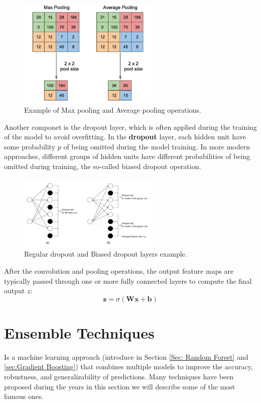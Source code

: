 \begin{figure}[H] 
    \centering
    \includegraphics[width=0.6\textwidth]{Machine_learning_thesis/Images/Max pooling and Average pooling.png}
    \caption{Example of Max pooling and Average pooling operations.} 
    \label{fig:Max pooling and Average pooling} 
\end{figure}
Another componet is the dropout layer, which is often applied during the training of the model to avoid overfitting. In the \textbf{dropout} layer, each hidden unit have some probability $p$ of being omitted
during the model training. In more modern approaches, different groups of hidden units have different probabilities of being omitted during training, the so-called biased dropout operation.
\begin{figure}[H] 
    \centering
    \includegraphics[width=0.6\textwidth]{Machine_learning_thesis/Images/Dropout.png}
    \caption{Regular dropout and Biased dropout layers example.} 
    \label{fig:Regular dropout and Biased dropout} 
\end{figure}
After the convolution and pooling operations, the output feature maps are typically passed through one or more fully connected layers to compute the final output $z$:
\[
\mathbf{z} = \sigma(\mathbf{W} \mathbf{x} + \mathbf{b})
\]


\section{Ensemble Techniques} 
\label{Sec: ensemble learning}
Is a machine learning approach (introduce in Section \ref{Sec: Random Forest} and \ref{sec:Gradient Boosting}) that combines multiple models to improve the accuracy, robustness, and generalizability of predictions. Many techniques have been proposed during the years in this section we will describe some of the most famous ones.

